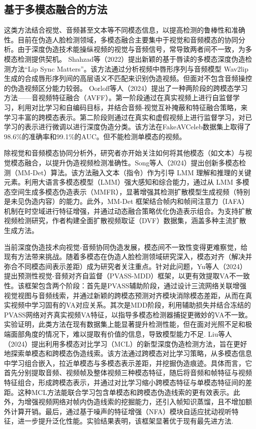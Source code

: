 \documentclass[conference]{IEEEtran}
\begin{document}
\subsection{基于多模态融合的方法}
这类方法结合视觉、音频甚至文本等不同模态信息，以提高检测的鲁棒性和准确性。目前在伪造人脸检测领域，多模态融合主要集中于视觉和音频模态的协同分析。由于深度伪造技术能操纵视频的视觉与音频信号，常导致两者间不一致，为多模态检测提供契机。
Shahzad等（2022）提出新颖的基于唇读的多模态深度伪造检测方法“Lip Sync Matters”。该方法通过分析视频中唇形序列与音频模型 Wav2lip 生成的合成唇形序列间的高层语义不匹配来识别伪造视频\cite{S.A.-427}。但面对不包含音频操控的伪造视频区分能力较弱。
Oorloff等人（2024）提出了一种两阶段的跨模态学习方法——音视频特征融合（AVFF）。第一阶段通过在真实视频上进行自监督学习，利用对比学习和自编码目标，并结合音频-视觉互补掩蔽和特征融合策略，来学习丰富的跨模态表示。第二阶段则通过在真实和虚假视频上进行监督学习，对已学习的表示进行微调以进行深度伪造分类。该方法在FakeAVCeleb数据集\cite{khalid2021fakeavceleb}上取得了98.6\%的准确率和99.1\%的AUC。但不能检测单模态的视频\cite{OorloffKoppisetti-290}。

除视觉和音频模态协同分析外，研究者亦开始关注如何将其他模态（如文本）与视觉模态融合，以提升伪造视频检测准确性。Song等人（2024）提出创新多模态检测（MM-Det）算法。该方法融入文本（指令）作为引导 LMM 理解和推理的关键元素。利用大语言多模态模型（LMM）强大感知和综合能力，通过从 LMM 多模态空间生成多模态伪造表示（MMFR），显著增强其检测扩散模型生成视频（特别是未见伪造内容）的能力。此外，MM-Det 框架结合帧内和帧间注意力（IAFA）机制在时空域进行特征增强，并通过动态融合策略优化伪造表示组合。为支持扩散视频检测研究，作者构建全面扩散视频取证（DVF）数据集，涵盖多种主流扩散生成方法\cite{SongGuo-428}。

当前深度伪造技术向视觉-音频协同伪造发展，模态间不一致性变得更难察觉，给现有方法带来挑战。随着多模态在伪造人脸检测领域研究深入，模态对齐（解决并弥合不同模态间表示差距）成为研究者关注重点。针对此问题，Yu等人（2024）提出预测性视觉-音频对齐自监督（PVASS-MDD）框架，以更有效提取VA不一致性。该框架包含两个阶段：首先是PVASS辅助阶段，通过设计三流网络关联增强视觉视图与音频线索，并通过新颖的跨模态预测对齐模块消除模态差距，从而在真实视频中学习固有的VA对应关系。其次是MDD阶段，利用辅助损失并结合冻结的PVASS网络对齐真实视频VA特征，以指导多模态检测器捕捉更微妙的VA不一致。实验证明，此类方法在现有数据集上能显著提升检测性能，但在面对光照不足和极端面部角度的情况下，难以提取有价值的信息，导致模型能力不足\cite{YuLiu-149}.
Liu等人（2024）提出利用多模态对比学习（MCL）的新型深度伪造检测方法，旨在更好地探索单模态和跨模态伪造线索。该方法通过跨模态对比学习策略，从多模态信息中学习组合嵌入，拉近单模态与多模态表示差距，并挖掘伪造痕迹。具体而言，它首先分别提取音频、视频帧及整体视频三种模态特征，随后将音频和帧特征与视频特征组合，形成跨模态表示，并通过对比学习缩小跨模态特征与单模态特征间的差距。这种MCL方法能联合学习包含单模态和跨模态伪造线索的更有效表示。此外，为增强视频网络对帧内伪造线索的挖掘能力，还引入帧知识蒸馏，且不增加额外计算开销。最后，通过基于噪声的特征增强（NFA）模块自适应扰动视听特征，进一步提升泛化性能。实验结果表明，该框架显著优于现有最先进方法\cite{LiuYu-76}.
\end{document}

